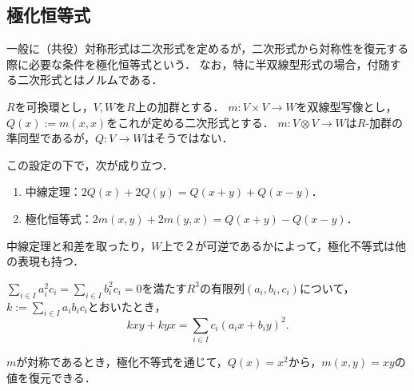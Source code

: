 \documentclass[uplatex, dvipdfmx]{jsreport}
\begin{document}
\subsection{極化恒等式}

\begin{tcolorbox}[colframe=ForestGreen, colback=ForestGreen!10!white,breakable,colbacktitle=ForestGreen!40!white,coltitle=black,fonttitle=\bfseries\sffamily,
title=]
    一般に（共役）対称形式は二次形式を定めるが，二次形式から対称性を復元する際に必要な条件を極化恒等式という．
    なお，特に半双線型形式の場合，付随する二次形式とはノルムである．
\end{tcolorbox}

\begin{notation}
    $R$を可換環とし，$V,W$を$R$上の加群とする．
    $m:V\times V\to W$を双線型写像とし，$Q(x):=m(x,x)$をこれが定める二次形式とする．
    $m:V\otimes V\to W$は$R$-加群の準同型であるが，$Q:V\to W$はそうではない．
    
    この設定の下で，次が成り立つ．
\end{notation}

\begin{proposition}\mbox{}
    \begin{enumerate}
        \item 中線定理：$2Q(x)+2Q(y)=Q(x+y)+Q(x-y)$．
        \item 極化恒等式：$2m(x,y)+2m(y,x)=Q(x+y)-Q(x-y)$．
    \end{enumerate}
    中線定理と和差を取ったり，$W$上で２が可逆であるかによって，極化不等式は他の表現も持つ．
\end{proposition}

\begin{proposition}[極化不等式の一般形]
    $\sum_{i\in I}a_i^2c_i=\sum_{i\in I}b_i^2c_i=0$を満たす$R^3$の有限列$(a_i,b_i,c_i)$について，$k:=\sum_{i\in I}a_ib_ic_i$とおいたとき，
    \[kxy+kyx=\sum_{i\in I}c_i(a_ix+b_iy)^2.\]
\end{proposition}

$m$が対称であるとき，極化不等式を通じて，$Q(x)=x^2$から，$m(x,y)=xy$の値を復元できる．
\end{document}
